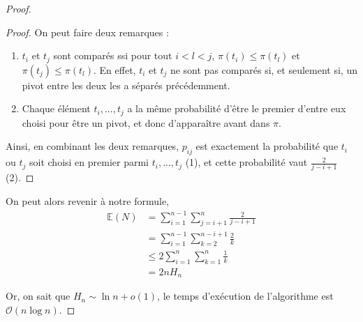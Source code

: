 \begin{proof}
\begin{proof}
On peut faire deux remarques :
\begin{enumerate}
\item $t_i$ et $t_j$ sont comparés ssi pour tout $i<l<j$, $\pi(t_i) \leq \pi(t_l)$ et $\pi(t_j) \leq \pi(t_l)$. En effet, $t_i$ et $t_j$ ne sont pas comparés si, et seulement si, un pivot entre les deux les a séparés précédemment.

\item Chaque élément $t_i,...,t_j$ a la même probabilité d'être le premier d'entre eux choisi pour être un pivot, et donc d'apparaître avant dans $\pi$.
\end{enumerate}

Ainsi, en combinant les deux remarques, $p_{ij}$ est exactement la probabilité que $t_i$ ou $t_j$ soit choisi en premier parmi $t_i,...,t_j$ (1), et cette probabilité vaut $\frac{2}{j-i+1}$ (2). 
\end{proof}

On peut alors revenir à notre formule,
\begin{align*}
\mathbb{E}(N) &= \sum_{ i=1}^{n-1} \sum_{j=i+1}^n \frac{2}{j-i+1} \\
&= \sum_{ i=1}^{n-1}\sum_{k=2}^{n-i+1}\frac{2}{k} \\
&\leq 2 \sum_{i=1}^{n} \sum_{k=1}^n \frac{1}{k} \\
&= 2nH_n
\end{align*}

Or, on sait que $H_n \sim \ln n + o(1)$, le temps d'exécution de l'algorithme est $\mathcal{O}(n\log n)$.
\end{proof}

